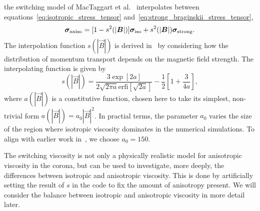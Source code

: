  the switching model of MacTaggart et al.~\cite{mactaggartBraginskiiMagnetohydrodynamicsArbitrary2017} interpolates between equations~\eqref{eq:isotropic_stress_tensor} and~\eqref{eq:strong_braginskii_stress_tensor},
\begin{equation}
{\bm \sigma}_{\text{aniso}} = [1 - s^2(|{\bm B}|)]{\bm \sigma}_{\text{iso}} + s^2(|{\bm B}|){\bm \sigma}_{\text{strong}}.
\label{eq:switching_stress_tensor}
\end{equation}
The interpolation function $s(|\vec{B}|)$ is derived in~\cite{mactaggartBraginskiiMagnetohydrodynamicsArbitrary2017} by considering how the distribution of momentum transport depends on the magnetic field strength. The interpolating function is given by
\begin{equation}
s(|\vec{B}|) = \frac{3 \exp[2a]}{2\sqrt{2\pi a} \text{erfi}[\sqrt{2a}]} - \frac{1}{2}\left[ 1 + \frac{3}{4a} \right],
\label{eq:s-function}
\end{equation}
where $a(|\vec{B}|)$ is a constitutive function, chosen here to take its simplest, non-trivial form $a(|\vec{B}|) = a_0 |\vec{B}|^2$. In practial terms, the parameter $a_0$ varies the size of the region where isotropic viscosity dominates in the numerical simulations. To align with earlier work in~\cite{mactaggartBraginskiiMagnetohydrodynamicsArbitrary2017}, we choose $a_0 = 150$. 

The switching viscosity is not only a physically realistic model for
anisotropic viscosity in the corona, but can  be used to investigate, more deeply, the differences between isotropic and anisotropic viscosity. This is done by artificially setting the result of $s$ in the code to fix the amount of anisotropy present. We will consider the balance between isotropic and anisotropic viscosity in more detail later.

